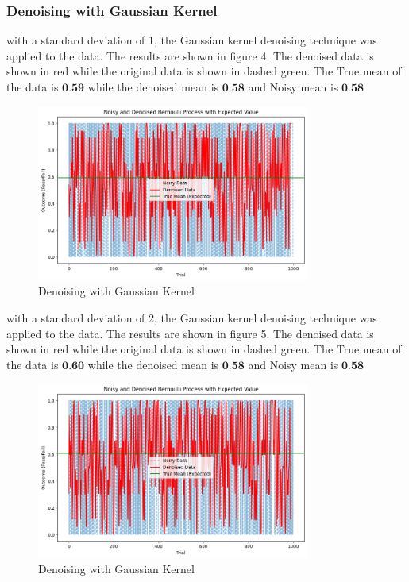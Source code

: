 \documentclass[a4paper,12pt]{article} %
\begin{document}
\subsubsection{ Denoising with Gaussian Kernel}
with a standard deviation of 1, the Gaussian kernel denoising technique was applied to the data. The results are shown in figure 4. The denoised data is shown in red while the original data is shown in dashed green. The True mean of the data is \(\textbf{0.59}\) while the denoised mean is \(\textbf{0.58}\) and Noisy mean is \(\textbf{0.58}\)
\begin{figure}[h]
\centering
\includegraphics[width=0.8\textwidth]{gaussian_1.png}
\caption{Denoising with Gaussian Kernel}
\end{figure}
\clearpage
with a standard deviation of 2, the Gaussian kernel denoising technique was applied to the data. The results are shown in figure 5. The denoised data is shown in red while the original data is shown in dashed green. The True mean of the data is \(\textbf{0.60}\) while the denoised mean is \(\textbf{0.58}\) and Noisy mean is \(\textbf{0.58}\)
\begin{figure}[h]
\centering
\includegraphics[width=0.8\textwidth]{gaussian_2.png}
\caption{Denoising with Gaussian Kernel}
\end{figure}
\end{document}
